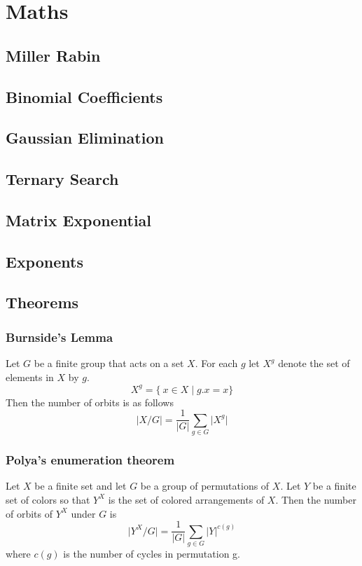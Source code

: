 \documentclass[twocolumn]{article}
\begin{document}
    \newpage
    \section{Maths}
        \subsection{Miller Rabin}
        
        \subsection{Binomial Coefficients}
        
        \subsection{Gaussian Elimination}
        
        \subsection{Ternary Search}
        
        \subsection{Matrix Exponential}
        
        \subsection{Exponents}
        
        \subsection{Theorems}
            \subsubsection{Burnside's Lemma}
            Let $G$ be a finite group that acts on a set $X$. For each $g$ let $X^g$ denote the set of elements in $X$ by $g$.
            \[ X^g = \{\ x \in X \mid g.x = x \} \]
            Then the number of orbits is as follows
            \[ \lvert X/G \rvert  = \frac{1}{\lvert G \rvert} \sum_{g\in G} \lvert X^g \rvert \]
            \subsubsection{Polya's enumeration theorem}
            Let $X$ be a finite set and let $G$ be a group of permutations of $X$. Let $Y$ be a finite set of colors so that $Y^X$ is the set of colored arrangements of $X$. Then the number of orbits of $Y^X$ under $G$ is
            \[\lvert Y^X/G\rvert = \frac{1}{\lvert G \rvert} \sum_{g \in G} \lvert Y \rvert^{c(g)} \]
            where $c(g)$ is the number of cycles in permutation g.
\end{document}
